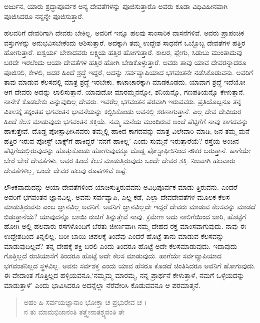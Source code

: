 {\small ಅರ್ಜುನ, ಯಾರು ಶ್ರದ್ಧಾಪೂರ್ವಕ ಅನ್ಯ ದೇವತೆಗಳನ್ನು ಪೂಜಿಸುತ್ತಾರೊ ಅವರು ಕೂಡಾ ವಿಧಿವಿಹೀನವಾಗಿ ಪೂಜಿಸಿದರೂ ನನ್ನನ್ನೇ ಪೂಜಿಸುತ್ತಾರೆ.}

ಹಲವರಿಗೆ ದೇವರಿಗಾಗಿ ದೇವರು ಬೇಕಿಲ್ಲ. ಅವರಿಗೆ ಇನ್ನೂ ಹಲವು ಸಾಂಸಾರಿಕ ವಾಸನೆಗಳಿವೆ. ಅವರು ಪ್ರಾಪಂಚಿಕ ವಸ್ತುಗಳನ್ನು ಅನುಭವಿಸಬೇಕೆಂದು ಆಶಿಸುತ್ತಾರೆ. ಅದಕ್ಕಾಗಿ ತಮ್ಮ ಉದ್ದೇಶ ಸಾಧನೆಗೆ ಒಬ್ಬೊಬ್ಬ ದೇವತೆಗಳ ಹತ್ತಿರ ಹೋಗುತ್ತಾರೆ. ಐಶ್ವರ್ಯ ಬೇಕಾದವರು ಲಕ್ಷ್ಮಿಯ ಹತ್ತಿರ ಹೋಗುತ್ತಾರೆ. ಕಾಲರ, ಪ್ಲೇಗು, ಸಿಡುಬು ಮುಂತಾದುವು ಬರದೇ ಇರಲೆಂದು ಆಯಾ ದೇವತೆಗಳ ಹತ್ತಿರ ಹೋಗಿ ಬೇಡಿಕೊಳ್ಳುತ್ತಾರೆ. ಅವರು ತಾವು ಯಾವ ದೇವರನ್ನಾದರೂ ಪೂಜಿಸಲಿ, ಕೇಳಲಿ, ಅದರ ಹಿಂದೆ ಶ್ರದ್ಧೆ ಇದ್ದರೆ, ಅದನ್ನು ಸರ್ವವ್ಯಾಪಿಯಾದ ಭಗವಂತನೇ ನಡೆಸಿಕೊಡುವನು. ಅವರಿಗೆ ತಾವು ಮಾಡುವ ಕೆಲಸದಲ್ಲಿ ಮಾತ್ರ ಶ್ರದ್ಧೆ ಇರಬೇಕು. ಕಾಟಾಚಾರಕ್ಕಾಗಿ ಮಾಡಕೂಡದು. ಯಾವಾಗ ಶ್ರದ್ಧೆ ಇದೆಯೋ ಆಗ ದೇವರು ಅದನ್ನು ಲಾಲಿಸುತ್ತಾನೆ. ಯಾವುದೋ ಮಾರಮ್ಮನನ್ನೋ, ಶನಿಯನ್ನೊ, ಗಣಪತಿಯನ್ನೊ ಕೇಳುತ್ತಾನೆ. ನಾನೇಕೆ ಕೊಡಬೇಕು ಎನ್ನುವುದಿಲ್ಲ ದೇವರು. ಇವರೆಲ್ಲ ಭಗವಂತನ ಪರವಾಗಿ ಇರುವವರು. ಪ್ರತಿಯೊಬ್ಬನೂ ತನ್ನ ವಿಕಾಸಕ್ಕೆ ತಕ್ಕಂತಹ ಭಗವಂತನ ಭಾವನೆಯನ್ನು ಕಲ್ಪಿಸಿಕೊಂಡು ಅವನಲ್ಲಿ ಶರಣಾಗುತ್ತಾನೆ. ಎಲ್ಲ ದೇವ ದೇವಿಯರ ಹಿಂದೆ ಕೆಲಸ ಮಾಡುವುದು ಭಗವಂತನ ಶಕ್ತಿಯೆ. ನಮ್ಮ ಮನೆಯ ಮುಂದಿರುವ ಅಂಚೆ ಪೆಟ್ಟಿಗೆಗೆ ನಾವು ಕಾಗದವನ್ನು ಹಾಕುತ್ತೇವೆ. ದೊಡ್ಡ ಪೋಸ್ಟಾಫೀಸಿನವರು ತಮ್ಮಲ್ಲಿ ಹಾಕಿದ ಕಾಗದವನ್ನು ಮಾತ್ರ ವಿಲೇವಾರಿ ಮಾಡಿ, ಜನ ತಮ್ಮ ಮನೆ ಹತ್ತಿರ ಇರುವ ಪೋಸ್ಟ್ ಬಾಕ್ಸ್​ಗೆ ಹಾಕಿದ್ದರೆ ‘ನನಗೆ ಹಾಕಿಲ್ಲ’ ಎಂದು ಸುಮ್ಮನೆ ಇರುತ್ತಾರೆಯೆ? ರಸ್ತೆಯ ಅಂಚಿನ ಪೆಟ್ಟಿಗೆಯಲ್ಲಿರುವುದನ್ನು ಹೊತ್ತುಕೊಂಡು ಹೋಗುವುದಕ್ಕೂ ದೊಡ್ಡ ಪೋಸ್ಟಾಫೀಸಿನಿಂದ ನೌಕರ ಬರುತ್ತಾನೆ. ಹಾಗೆಯೇ ಬೇರೆ ಬೇರೆ ದೇವತೆಗಳು. ಅವರ ಹಿಂದೆ ಕೆಲಸ ಮಾಡುತ್ತಿರುವುದು ಒಂದೇ ದೇವರ ಶಕ್ತಿ. ನಿಜವಾಗಿ ಹಲವಾರು ದೇವತೆಗಳಿಲ್ಲ, ಒಂದೇ ದೇವರ ಹಲವು ರೂಪಗಳಿವೆ ಅಷ್ಟೆ.

ಲೌಕಿಕವಾದುದನ್ನು ಆಯಾ ದೇವತೆಗಳಿಂದ ಯಾಚಿಸುತ್ತಿರುವವನು ಅವಿಧಿಪೂರ್ವಕ ಮಾಡು ತ್ತಿರುವನು. ಎಂದರೆ ಅವರಿಗೆ ಭಗವಂತನ ಜ್ಞಾನವಿಲ್ಲ. ಅವನು ಸರ್ವವ್ಯಾಪಿ, ಎಲ್ಲ ಕಡೆ, ಎಲ್ಲಾ ದೇವದೇವತೆಗಳ ಮೂಲಕ ಕೆಲಸ ಮಾಡುತ್ತಿರುವನು ಎಂಬ ಜ್ಞಾನವಿಲ್ಲ ಅವನಿಗೆ. ಅವನಿಗೆ ಜ್ಞಾನವಿಲ್ಲದೇ ಇದ್ದರೆ ದೇವರು ಮಾಡುವ ಕೆಲಸವನ್ನು ಮಾಡದೆ ಬಿಡುತ್ತಾನೆಯೆ? ಯಾವುದನ್ನೊ ಬಾಯಿ ರುಚಿಗೆ ತಿನ್ನುತ್ತೇವೆ ನಾವು. ಕ್ರಮೇಣ ಅದು ನಾಲಿಗೆಯಿಂದ ಜಾರಿ, ಹೊಟ್ಟೆಗೆ ಹೋಗಿ ಅಲ್ಲಿ ಹಲವಾರು ರಸಗಳೊಂದಿಗೆ ಬೆರತು ಜೀರ್ಣವಾಗಿ ನಮ್ಮ ದೇಹದ ರಕ್ತ ಮಾಂಸವಾಗುವುದು. ನಾವು ಈ ಉದ್ದೇಶದಿಂದ ತಿನ್ನಲಿಲ್ಲ. ಬರೀ ಬಾಯಿ ಚಪಲಕ್ಕೆ ತಿಂದೆವು ಎಂದರೆ ಹೊಟ್ಟೆ ತಾನು ಮಾಡುವ ಕೆಲಸವನ್ನು ಮಾಡುವುದಿಲ್ಲವೆ? ತನ್ನ ದೇಹಕ್ಕೆ ಶಕ್ತಿ ಬರಲಿ ಎಂದು ತಿಂದರೂ ಹೊಟ್ಟೆ ಅದೇ ಕೆಲಸಮಾಡುವುದು. ಇದಾವುದು ಗೊತ್ತಿಲ್ಲದೆ ರುಚಿಯಾಸೆಗೆ ತಿಂದರೂ ಹೊಟ್ಟೆ ಅದೇ ಕೆಲಸ ಮಾಡುವುದು. ಹಾಗೆಯೇ ಸರ್ವವ್ಯಾಪಿಯಾದ ಭಗವಂತನಿಲ್ಲದ ಸ್ಥಳವಿಲ್ಲ. ಅವನು ಸರ್ವಶಕ್ತ ಎಂದು ಯಾವ ಹೆಸರೂ ಕೊಡದೆ ಚಿಂತಿಸಿದರೂ ಅವನಿಗೆ ಹೋಗುವುದು. ಈ ವೇದಾಂತ ಗೊತ್ತಿಲ್ಲದ ಹಳ್ಳಿಯವನೂ,‘ನಮ್ಮಮ್ಮ ಮಾರಮ್ಮ, ನನ್ನ ಪ್ರಾರ್ಥನೆ ಕೇಳುತ್ತಾಳೆ, ನಮಗೆ ಒಳ್ಳೆಯದನ್ನು ಮಾಡುತ್ತಾಳೆ’ ಎಂದು ಭಾವಿಸಿದರೂ ಅದನ್ನೆಲ್ಲಾ ನೆರೆವೇರಿಸಿ ಕೊಡುವವನೂ ಆ ಪರಮಾತ್ಮನೆ.

\begin{verse}
ಅಹಂ ಹಿ ಸರ್ವಯಜ್ಞಾನಾಂ ಭೋಕ್ತಾ ಚ ಪ್ರಭುರೇವ ಚ ।\\ನ ತು ಮಾಮಭಿಜಾನಂತಿ ತತ್ತ್ವೇನಾತಶ್ಚ್ಯವಂತಿ ತೇ 
\end{verse}

